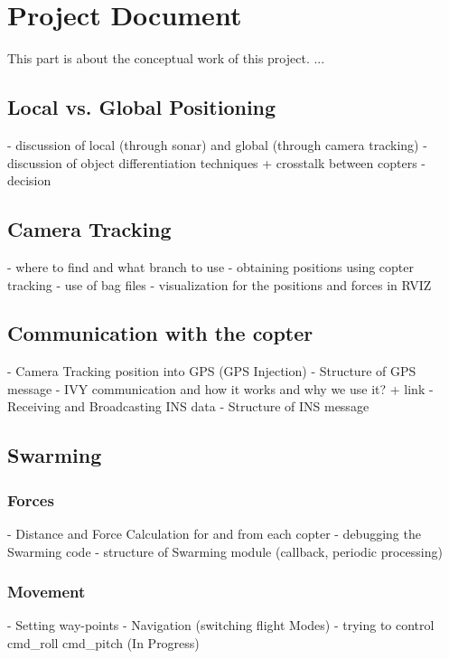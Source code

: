 \chapter{Project Document}\label{ch:ch2label}

This part is about the conceptual work of this project. ...

\section{Local vs. Global Positioning}
- discussion of local (through sonar) and global (through camera tracking) 
- discussion of object differentiation techniques + crosstalk between copters
- decision 

\section{Camera Tracking}
- where to find and what branch to use
- obtaining positions using copter tracking
- use of bag files
- visualization for the positions and forces in RVIZ

\section{Communication with the copter}
- Camera Tracking position into GPS (GPS Injection)
- Structure of GPS message
- IVY communication and how it works and why we use it? + link
- Receiving and Broadcasting INS data
- Structure of INS message 

\section{Swarming}

\subsection{Forces}
- Distance and Force Calculation for and from each copter
- debugging the Swarming code
- structure of Swarming module (callback, periodic processing)

\subsection{Movement}
- Setting way-points
- Navigation (switching flight Modes)
- trying to control cmd_roll cmd_pitch (In Progress) 
